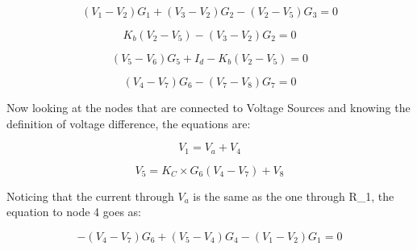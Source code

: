 \begin{equation}
  (V_1-V_2)G_1 + (V_3-V_2)G_2 - (V_2-V_5)G_3 = 0
  \label{eq:Node2}
\end{equation}

\begin{equation}
  K_b(V_2-V_5) - (V_3-V_2)G_2 = 0
  \label{eq:Node3}
\end{equation}

\begin{equation}
  (V_5-V_6)G_5 + I_d - K_b(V_2-V_5) = 0
  \label{eq:Node6}
\end{equation}

\begin{equation}
  (V_4-V_7)G_6 - (V_7-V_8)G_7 = 0
  \label{eq:Node7}
\end{equation}

Now looking at the nodes that are connected to Voltage Sources and knowing the definition of voltage difference, the equations are:

\begin{equation}
  V_1 = V_a + V_4
  \label{eq:Node1}
\end{equation}

\begin{equation}
  V_5= K_C \times G_6(V_4-V_7) + V_8
  \label{eq:Node5}
\end{equation}

Noticing that the current through $V_a$ is the same as the one through R_1, the equation to node 4 goes as:

\begin{equation}
  -(V_4-V_7)G_6 + (V_5-V_4)G_4 - (V_1-V_2)G_1 = 0
  \label{eq:Node5}
\end{equation}

